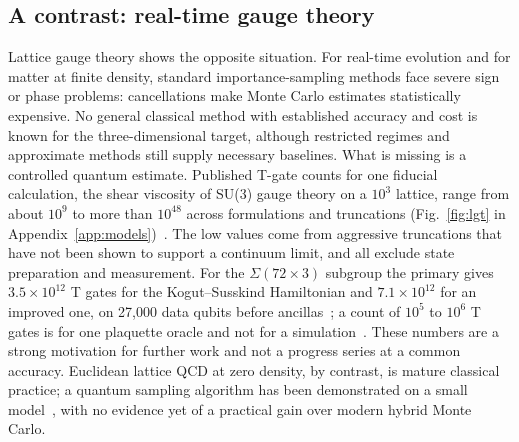 \subsection{A contrast: real-time gauge theory}
\label{sec:gauge}
Lattice gauge theory shows the opposite situation. For real-time evolution and for matter at finite density, standard importance-sampling methods face severe sign or phase problems: cancellations make Monte Carlo estimates statistically expensive. No general classical method with established accuracy and cost is known for the three-dimensional target, although restricted regimes and approximate methods still supply necessary baselines. What is missing is a controlled quantum estimate. Published T-gate counts for one fiducial calculation, the shear viscosity of SU(3) gauge theory on a $10^3$ lattice, range from about $10^9$ to more than $10^{48}$ across formulations and truncations (Fig.~\ref{fig:lgt} in Appendix~\ref{app:models})~\cite{lamm2026,ciavarella2025,rhodes2024}. The low values come from aggressive truncations that have not been shown to support a continuum limit, and all exclude state preparation and measurement. For the $\Sigma(72\times3)$ subgroup the primary gives $3.5\times10^{12}$ T gates for the Kogut--Susskind Hamiltonian and $7.1\times10^{12}$ for an improved one, on 27{,}000 data qubits before ancillas~\cite{osorio2025}; a count of $10^5$ to $10^6$ T gates is for one plaquette oracle and not for a simulation~\cite{draper2026}. These numbers are a strong motivation for further work and not a progress series at a common accuracy. Euclidean lattice QCD at zero density, by contrast, is mature classical practice; a quantum sampling algorithm has been demonstrated on a small model~\cite{yamamoto2022}, with no evidence yet of a practical gain over modern hybrid Monte Carlo.
